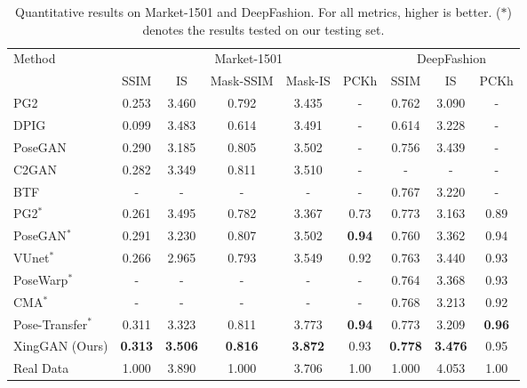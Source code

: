 \documentclass[runningheads]{llncs}
\begin{document}
\begin{table*}[!t]
	\centering
	\caption{Quantitative results on Market-1501 and DeepFashion. For all metrics, higher is better. ($\ast$) denotes the results tested on our testing set.}
		\begin{tabular}{lcccccccc} \toprule
			\multirow{2}{*}{Method}  & \multicolumn{5}{c}{Market-1501} & \multicolumn{3}{c}{DeepFashion} \\ \cmidrule(lr){2-6} \cmidrule(lr){7-9} 
			 & SSIM & IS   & Mask-SSIM & Mask-IS  & PCKh  & SSIM  & IS  & PCKh      \\ \hline	
			PG2~\cite{ma2017pose}                                        & 0.253 & 3.460 & 0.792 & 3.435   & - & 0.762 & 3.090  & - \\
			DPIG~\cite{ma2018disentangled}                           & 0.099 & 3.483 & 0.614 & 3.491   & - & 0.614 & 3.228    & - \\
			PoseGAN~\cite{siarohin2018deformable}              & 0.290 & 3.185 & 0.805 & 3.502   & - & 0.756 & 3.439    & -\\ 
			C2GAN~\cite{tang2019cycle}                                & 0.282 & 3.349 & 0.811 & 3.510   & - & -     & -            & -\\ 
			BTF~\cite{albahar2019guided}                               & -     & -     & -     & -       & - & 0.767 & 3.220                   & -\\ \hline
			PG2$^\ast$~\cite{ma2017pose}                             & 0.261 & 3.495 & 0.782 & 3.367   &0.73 & 0.773 & 3.163  & 0.89 \\ 
			PoseGAN$^\ast$~\cite{siarohin2018deformable}    & 0.291 & 3.230 & 0.807 & 3.502   & \textbf{0.94} & 0.760 & 3.362 & 0.94 \\ 
			VUnet$^\ast$~\cite{esser2018variational}              & 0.266 & 2.965 & 0.793 & 3.549   & 0.92 & 0.763 & 3.440 & 0.93 \\
			PoseWarp$^\ast$~\cite{balakrishnan2018synthesizing} &  - & - & - & - & - & 0.764 & 3.368 & 0.93 \\
			CMA$^\ast$~\cite{chi2019two} &  - & - & - & - & - & 0.768 & 3.213 & 0.92 \\
			Pose-Transfer$^\ast$~\cite{zhu2019progressive}  & 0.311 & 3.323 & 0.811 & 3.773   & \textbf{0.94} & 0.773 & 3.209 & \textbf{0.96} \\  
			XingGAN (Ours)                                                    & \textbf{0.313} & \textbf{3.506} & \textbf{0.816} & \textbf{3.872} & 0.93    &  \textbf{0.778} & \textbf{3.476}  & 0.95 \\ \hline	
			Real Data                                                               & 1.000 & 3.890 & 1.000 & 3.706   & 1.00 & 1.000 & 4.053 & 1.00 \\	
			\bottomrule	
	\end{tabular}
	\label{tab:pose_reuslts}
\end{table*}
\end{document}
